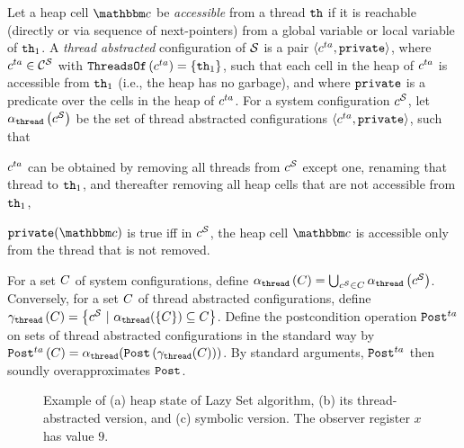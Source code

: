 Let a heap cell $\cell$ be {\em accessible} from a thread ${\tt th}$ if
it is reachable (directly or via sequence of
next-pointers) from a global variable or local variable of ${\tt th}_1$.
A {\it thread abstracted} configuration of ${\mathcal S}$
is  a pair $\left\langle c^{ta},{\tt private}\right\rangle$, where
$c^{ta} \in {\mathcal C}^{{\mathcal S}}$ with
${\tt ThreadsOf}\left(c^{ta}\right) = \left\{{\tt th}_1\right\}$, such that
each cell in the heap of $c^{ta}$ is accessible from ${\tt th}_1$
(i.e., the heap has no garbage), and where ${\tt private}$ is a predicate over the
cells in the heap of $c^{ta}$.
For a system configuration $c^{\mathcal S}$,
let $\alpha_{\tt thread}\left(c^{\mathcal S}\right)$ be the set of 
thread abstracted configurations $\left\langle c^{ta},{\tt private}\right\rangle$, such that
\begin{inparaenum}[(i)]
\item
  $c^{ta}$ can be obtained by
  removing all threads from $c^{\mathcal S}$ except one,
  renaming that thread
  to ${\tt th}_1$, and thereafter removing all heap cells that are not
  accessible from ${\tt th}_1$,
\item
  $\private(\cell)$ is true iff in $c^{\mathcal S}$, the heap cell
  $\cell$ is accessible only from
  the thread that is not removed.
\end{inparaenum}
For  a set $C$ of system configurations, define
$\alpha_{\tt thread}\left(C\right) = \mathop\bigcup_{c^{\mathcal S} \in C}\alpha_{\tt thread}\left(c^{\mathcal S}\right)$.
Conversely, for a set $C$ of thread abstracted configurations,
define
$\gamma_{\tt thread}\left(C\right)=
\left\{c^{\mathcal S}\ | \ \alpha_{\tt thread}(\{C\})\subseteq C\right\}$.
%
Define the postcondition operation ${\tt Post}^{ta}$ on sets of
thread abstracted configurations in the standard way by
\(
{\tt Post}^{ta}\left(C\right) =
\alpha_{\tt thread}({\tt Post}\left(\gamma_{\tt thread}(C)\right))
\).
By standard arguments, ${\tt Post}^{ta}$ then soundly overapproximates
${\tt Post}$.


 

\begin{figure}[h]
\center
	
\caption{Example of (a) heap state of Lazy Set algorithm, (b) its thread-abstracted version, and (c) symbolic version.
  The observer register $x$ has value $9$.}
\label{fig:llshapes}
\end{figure}


